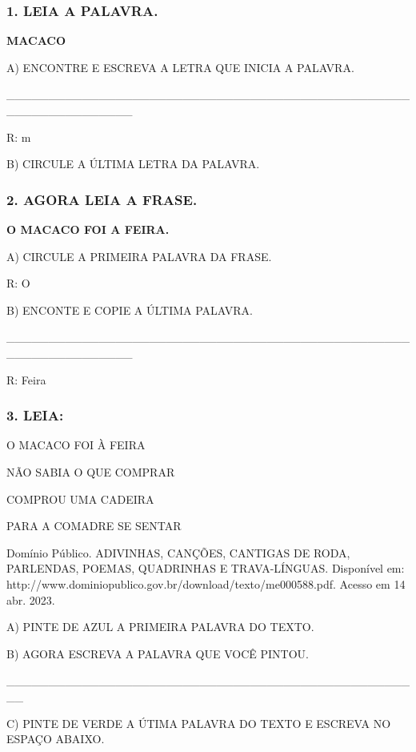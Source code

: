 \subsubsection{1. LEIA A PALAVRA.}\label{leia-a-palavra.}

\textbf{MACACO}

A) ENCONTRE E ESCREVA A LETRA QUE INICIA A PALAVRA.

\_\_\_\_\_\_\_\_\_\_\_\_\_\_\_\_\_\_\_\_\_\_\_\_\_\_\_\_\_\_\_\_\_\_\_\_\_\_\_\_\_\_\_\_\_\_\_\_\_\_\_\_\_\_\_\_\_\_\_\_\_\_\_

R: m

B) CIRCULE A ÚLTIMA LETRA DA PALAVRA.

\subsubsection{2. AGORA LEIA A FRASE.}\label{agora-leia-a-frase.}

\textbf{O MACACO FOI A FEIRA.}

A) CIRCULE A PRIMEIRA PALAVRA DA FRASE.

R: O

B) ENCONTE E COPIE A ÚLTIMA PALAVRA.

\_\_\_\_\_\_\_\_\_\_\_\_\_\_\_\_\_\_\_\_\_\_\_\_\_\_\_\_\_\_\_\_\_\_\_\_\_\_\_\_\_\_\_\_\_\_\_\_\_\_\_\_\_\_\_\_\_\_\_\_\_\_\_

R: Feira

\subsubsection{3. LEIA:}\label{leia}

O MACACO FOI À FEIRA

NÃO SABIA O QUE COMPRAR

COMPROU UMA CADEIRA

PARA A COMADRE SE SENTAR

Domínio Público. ADIVINHAS, CANÇÕES, CANTIGAS DE RODA, PARLENDAS, POEMAS, QUADRINHAS E TRAVA-LÍNGUAS. Disponível em: http://www.dominiopublico.gov.br/download/texto/me000588.pdf. Acesso em 14 abr. 2023.

A) PINTE DE AZUL A PRIMEIRA PALAVRA DO TEXTO.

B) AGORA ESCREVA A PALAVRA QUE VOCÊ PINTOU.

\_\_\_\_\_\_\_\_\_\_\_\_\_\_\_\_\_\_\_\_\_\_\_\_\_\_\_\_\_\_\_\_\_\_\_\_\_\_\_\_\_\_\_\_\_\_\_\_\_\_

C) PINTE DE VERDE A ÚTIMA PALAVRA DO TEXTO E ESCREVA NO ESPAÇO ABAIXO.

